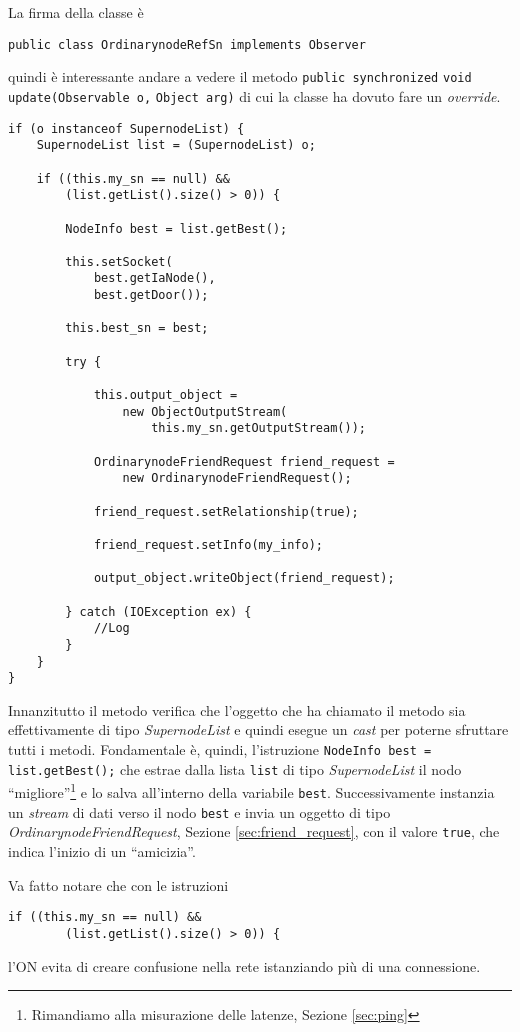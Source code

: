La firma della classe è
\begin{verbatim}
public class OrdinarynodeRefSn implements Observer
\end{verbatim}
quindi è interessante andare a vedere il metodo \verb|public synchronized| \verb|void| \verb|update(Observable o,| \verb|Object arg)| di cui la classe ha dovuto fare un \emph{override}.

\begin{lstlisting}
if (o instanceof SupernodeList) {
	SupernodeList list = (SupernodeList) o;

	if ((this.my_sn == null) && 
		(list.getList().size() > 0)) {
		
		NodeInfo best = list.getBest();

		this.setSocket(
			best.getIaNode(), 
			best.getDoor());
			
		this.best_sn = best;
		
		try {

			this.output_object = 
				new ObjectOutputStream(
					this.my_sn.getOutputStream());

			OrdinarynodeFriendRequest friend_request = 
				new OrdinarynodeFriendRequest();
				
			friend_request.setRelationship(true);
			
			friend_request.setInfo(my_info);
			
			output_object.writeObject(friend_request);

		} catch (IOException ex) {
			//Log
		}
	}
}
\end{lstlisting}
Innanzitutto il metodo verifica che l'oggetto che ha chiamato il metodo sia effettivamente di tipo \emph{SupernodeList} e 
quindi esegue un \emph{cast} per poterne sfruttare tutti i metodi.
Fondamentale è, quindi, l'istruzione \verb|NodeInfo best =| \verb|list.getBest();| che estrae dalla lista \verb|list| di tipo \emph{SupernodeList}
il nodo ``migliore''\footnote{Rimandiamo alla misurazione delle latenze, Sezione \ref{sec:ping}} e lo salva all'interno della variabile
\verb|best|.
Successivamente instanzia un \emph{stream} di dati verso il nodo \verb|best| e invia un oggetto di tipo \emph{OrdinarynodeFriendRequest}, Sezione
\ref{sec:friend_request}, con il valore \verb|true|, che indica l'inizio di un ``amicizia''.

Va fatto notare che con le istruzioni
\begin{lstlisting}
if ((this.my_sn == null) && 
		(list.getList().size() > 0)) {
\end{lstlisting}
l'ON evita di creare confusione nella rete istanziando più di una connessione.

